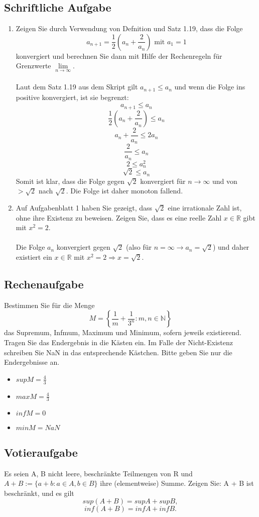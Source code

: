 \documentclass[a4paper]{article}
\begin{document}
\subsection{Schriftliche Aufgabe}
\begin{enumerate}[label=(\alph*)]
    \item Zeigen Sie durch Verwendung von Defnition und Satz 1.19, dass die Folge
    \[
        a_{n+1} = \frac{1}{2} \left(a_n + \frac{2}{a_n} \right) \text{ mit } a_1 = 1
    \]
    konvergiert und berechnen Sie dann mit Hilfe der Rechenregeln für Grenzwerte $\lim\limits_{n \to \infty}$.\\\\
    Laut dem Satz 1.19 aus dem Skript gilt $a_{n + 1} \leq a_n$ und wenn die Folge ins positive konvergiert, ist sie begrenzt:\\
    \[
        a_{n + 1} \leq a_n
    \]
    \[
        \frac{1}{2}\left(a_n + \frac{2}{a_n}\right) \leq a_n
    \]
    \[
        a_n + \frac{2}{a_n} \leq 2a_n 
    \]
    \[
        \frac{2}{a_n} \leq a_n
    \]
    \[
        2 \leq a_n^2
    \]
    \[
        \sqrt{2} \leq a_n
    \]
Somit ist klar, dass die Folge gegen $\sqrt{2}$ konvergiert für $n \to \infty$ und von $> \sqrt{2}$ nach $\sqrt{2}$. Die Folge ist daher monoton fallend.
    \item Auf Aufgabenblatt 1 haben Sie gezeigt, dass $\sqrt{2}$ eine irrationale Zahl ist, ohne ihre Existenz zu beweisen. Zeigen Sie, dass es eine reelle Zahl $x \in \mathbb{R}$ gibt mit $x^2 = 2$.\\\\
    Die Folge $a_n$ konvergiert gegen $\sqrt{2}$ (also für $n = \infty \to a_n = \sqrt{2}$) und daher existiert ein $x \in \mathbb{R}$ mit $x^2 = 2 \Rightarrow x = \sqrt{2}$.
\end{enumerate}
\bigskip
\subsection{Rechenaufgabe}
Bestimmen Sie für die Menge
\[
    M =  \left\{ \frac{1}{m} + \frac{1}{3^n} : m, n \in \mathbb{N} \right\}
\]
das Supremum, Infmum, Maximum und Minimum, sofern jeweils existierend. Tragen Sie das Endergebnis in die Kästen ein. Im Falle der Nicht-Existenz schreiben Sie NaN in das entsprechende Kästchen. Bitte geben Sie nur die Endergebnisse an.\\
\begin{itemize}
    \item $sup M = \frac{4}{3}$
    \item $max M = \frac{4}{3}$
    \item $inf M = 0$
    \item $min M = NaN$
\end{itemize}
\bigskip
\subsection{Votieraufgabe}
Es seien A, B nicht leere, beschränkte Teilmengen von R und $A + B := \{a + b : a \in A, b \in B\}$ ihre (elementweise) Summe. Zeigen Sie: A + B ist beschränkt, und es gilt
\[
    sup(A + B) = sup A + sup B,
\]
\[
    inf(A + B) = inf A + inf B.
\]
\end{document}
